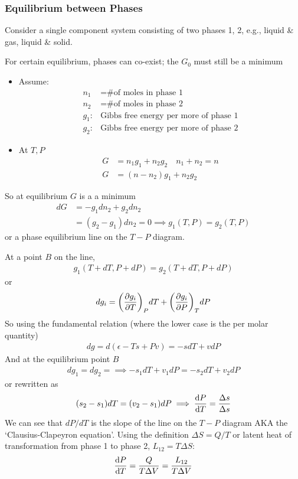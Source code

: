 \documentclass[../main.tex]{subfiles}
\begin{document}
\newpage
{}
\subsubsection{Equilibrium between Phases}
Consider a single component system consisting of two phases 1, 2, e.g., liquid \& gas, liquid \& solid.

For certain equilibrium, phases can co-exist; the $G_0$ must still be a minimum
\begin{itemize}
    \item Assume:
    \begin{align*}
        n_1 &= \textrm{\# of moles in phase 1} \\
        n_2 &= \textrm{\# of moles in phase 2} \\
        g_1: &\textrm{Gibbs free energy per more of phase 1} \\
        g_2: &\textrm{Gibbs free energy per more of phase 2}
    \end{align*}
    \item At $T, P$
    \begin{align*}
        G &= n_1 g_1 + n_2 g_2 \quad n_1 + n_2 = n \\
        G &= (n - n_2) g_1 + n_2 g_2
    \end{align*}
\end{itemize}
So at equilibrium $G$ is a a minimum
\begin{align*}
    dG &= -g_1 dn_2 + g_2 dn_2 \\
    &= (g_2 - g_1) dn_2 = 0 \implies g_1(T,P) = g_2(T,P)
\end{align*}
or a phase equilibrium line on the $T-P$ diagram.

At a point $B$ on the line,
\begin{align*}
    g_1(T + dT, P + dP) = g_2(T + dT, P + dP)
\end{align*}
or
\begin{align*}
    dg_i = \qt(\pdv{g_i}{T})_P dT + \qt(\pdv{g_i}{P})_T dP 
\end{align*}
So using the fundamental relation (where the lower case is the per molar quantity)
\begin{align*}
    dg = d (\epsilon - Ts + Pv) = -s dT + v dP 
\end{align*}
And at the equilibrium point $B$
\begin{align*}
    dg_1 = dg_2 = \implies - s_1 dT + v_1 dP = - s_2 dT + v_2 dP
\end{align*}
or rewritten as
\begin{align*}
    (s_2 - s_1) dT = (v_2 - s_1) dP \implies \dv{P}{T} = \frac{\Delta s}{\Delta s}
\end{align*}
We can see that $dP/dT$ is the slope of the line on the $T-P$ diagram AKA the `Clausius-Clapeyron equation'.
Using the definition $\Delta S = Q / T$ or latent heat of transformation from phase 1 to phase 2, $L_{12} = T \Delta S$:
\begin{align*}
    \dv{P}{T} = \frac{Q}{T \Delta V} = \frac{L_{12}}{T \Delta V}
\end{align*}
\end{document}
